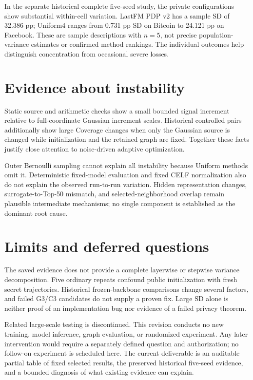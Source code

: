 In the separate historical complete five-seed study, the private configurations show substantial within-cell variation. LastFM PDP v2 has a sample SD of 32.386 pp; Uniform4 ranges from 0.731 pp SD on Bitcoin to 24.121 pp on Facebook. These are sample descriptions with $n=5$, not precise population-variance estimates or confirmed method rankings. The individual outcomes help distinguish concentration from occasional severe losses.

\section{Evidence about instability}
Static source and arithmetic checks show a small bounded signal increment relative to full-coordinate Gaussian increment scales. Historical controlled pairs additionally show large Coverage changes when only the Gaussian source is changed while initialization and the retained graph are fixed. Together these facts justify close attention to noise-driven adaptive optimization.

Outer Bernoulli sampling cannot explain all instability because Uniform methods omit it. Deterministic fixed-model evaluation and fixed CELF normalization also do not explain the observed run-to-run variation. Hidden representation changes, surrogate-to-Top-50 mismatch, and selected-neighborhood overlap remain plausible intermediate mechanisms; no single component is established as the dominant root cause.

\section{Limits and deferred questions}
The saved evidence does not provide a complete layerwise or stepwise variance decomposition. Five ordinary repeats confound public initialization with fresh secret trajectories. Historical frozen-backbone comparisons change several factors, and failed G3/C3 candidates do not supply a proven fix. Large SD alone is neither proof of an implementation bug nor evidence of a failed privacy theorem.

Related large-scale testing is discontinued. This revision conducts no new training, model inference, graph evaluation, or randomized experiment. Any later intervention would require a separately defined question and authorization; no follow-on experiment is scheduled here. The current deliverable is an auditable partial table of fixed selected results, the preserved historical five-seed evidence, and a bounded diagnosis of what existing evidence can explain.
